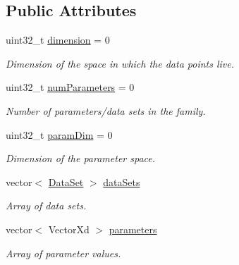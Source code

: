 \subsection*{Public Attributes}
\begin{DoxyCompactItemize}
\item 
\hypertarget{struct_d_r_d_s_p_1_1_data_system_ab6aefaa08cd0a5b6a9e83105ecd56289}{uint32\-\_\-t \hyperlink{struct_d_r_d_s_p_1_1_data_system_ab6aefaa08cd0a5b6a9e83105ecd56289}{dimension} = 0}\label{struct_d_r_d_s_p_1_1_data_system_ab6aefaa08cd0a5b6a9e83105ecd56289}

\begin{DoxyCompactList}\small\item\em Dimension of the space in which the data points live. \end{DoxyCompactList}\item 
\hypertarget{struct_d_r_d_s_p_1_1_data_system_a621ef4f4452821030bb57e93dadf334e}{uint32\-\_\-t \hyperlink{struct_d_r_d_s_p_1_1_data_system_a621ef4f4452821030bb57e93dadf334e}{num\-Parameters} = 0}\label{struct_d_r_d_s_p_1_1_data_system_a621ef4f4452821030bb57e93dadf334e}

\begin{DoxyCompactList}\small\item\em Number of parameters/data sets in the family. \end{DoxyCompactList}\item 
\hypertarget{struct_d_r_d_s_p_1_1_data_system_a11e4d274af9cfc398b7f1b6b49427f9b}{uint32\-\_\-t \hyperlink{struct_d_r_d_s_p_1_1_data_system_a11e4d274af9cfc398b7f1b6b49427f9b}{param\-Dim} = 0}\label{struct_d_r_d_s_p_1_1_data_system_a11e4d274af9cfc398b7f1b6b49427f9b}

\begin{DoxyCompactList}\small\item\em Dimension of the parameter space. \end{DoxyCompactList}\item 
\hypertarget{struct_d_r_d_s_p_1_1_data_system_a5fe0b41909f9056f986b4284e0fcb614}{vector$<$ \hyperlink{struct_d_r_d_s_p_1_1_data_set}{Data\-Set} $>$ \hyperlink{struct_d_r_d_s_p_1_1_data_system_a5fe0b41909f9056f986b4284e0fcb614}{data\-Sets}}\label{struct_d_r_d_s_p_1_1_data_system_a5fe0b41909f9056f986b4284e0fcb614}

\begin{DoxyCompactList}\small\item\em Array of data sets. \end{DoxyCompactList}\item 
\hypertarget{struct_d_r_d_s_p_1_1_data_system_aae14ac3e8c2e1a397759cd3a4d8a102f}{vector$<$ Vector\-Xd $>$ \hyperlink{struct_d_r_d_s_p_1_1_data_system_aae14ac3e8c2e1a397759cd3a4d8a102f}{parameters}}\label{struct_d_r_d_s_p_1_1_data_system_aae14ac3e8c2e1a397759cd3a4d8a102f}

\begin{DoxyCompactList}\small\item\em Array of parameter values. \end{DoxyCompactList}\end{DoxyCompactItemize}


